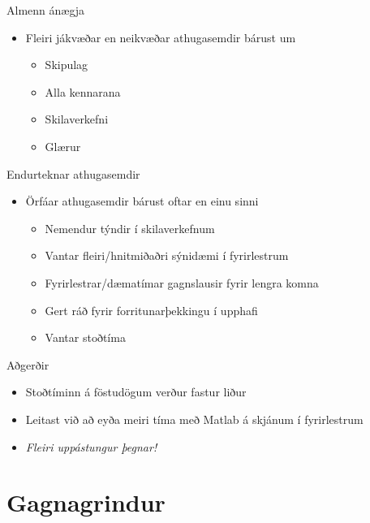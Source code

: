 \documentclass{beamer}
\begin{document}
\begin{frame}{Almenn ánægja}
    \begin{itemize}
        \item Fleiri jákvæðar en neikvæðar athugasemdir bárust um
        \begin{itemize}[<+->]
            \item Skipulag
            \item Alla kennarana
            \item Skilaverkefni
            \item Glærur
        \end{itemize}
    \end{itemize}
\end{frame}

\begin{frame}{Endurteknar athugasemdir}
    \begin{itemize}
        \item Örfáar athugasemdir bárust oftar en einu sinni
        \begin{itemize}
            \item Nemendur týndir í skilaverkefnum
            \item Vantar fleiri/hnitmiðaðri sýnidæmi í fyrirlestrum
            \item Fyrirlestrar/dæmatímar gagnslausir fyrir lengra komna
            \item Gert ráð fyrir forritunarþekkingu í upphafi
            \item Vantar stoðtíma
        \end{itemize}
    \end{itemize}
\end{frame}

\begin{frame}{Aðgerðir}
    \begin{itemize}
        \item Stoðtíminn á föstudögum verður fastur liður
        \item Leitast við að eyða meiri tíma með Matlab á skjánum í fyrirlestrum
        \item \emph{Fleiri uppástungur þegnar!}
    \end{itemize}
\end{frame}

\section{Gagnagrindur}
\end{document}

